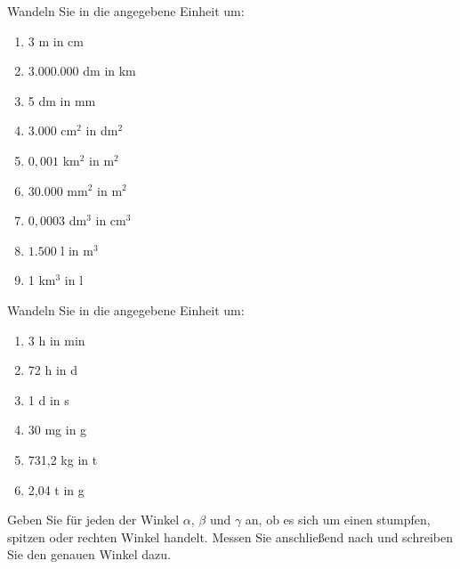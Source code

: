 \documentclass[11pt, a4paper, oneside]{article}
\begin{document}
	
	Wandeln Sie in die angegebene Einheit um:
	
	\begin{multicols}{3}
		\begin{enumerate}[label=\alph*)]
			\item 3 m in cm
			\item $3.000.000$ dm in km
			\item 5 dm in mm
			\item $3.000$ cm$^2$ in dm$^2$
			\item $0,001$ km$^2$ in m$^2$
			\item $30.000$ mm$^2$ in m$^2$
			\item $0,0003$ dm$^3$ in cm$^3$
			\item $1.500$ l in m$^3$
			\item 1 km$^3$ in l
		\end{enumerate}
	\end{multicols}
	
	\checkered[7.5cm]
	
	
	Wandeln Sie in die angegebene Einheit um:
	
	\begin{multicols}{2}
		\begin{enumerate}[label=\alph*)]
			\item 3 h in min
			\item 72 h in d
			\item 1 d in s
			\item 30 mg in g
			\item 731,2 kg in t
			\item 2,04 t in g
		\end{enumerate}
	\end{multicols}
	
	\checkered[4.5cm]
	
	
	Geben Sie für jeden der Winkel $\alpha$, $\beta$ und $\gamma$ an, ob es sich um einen stumpfen, spitzen oder rechten Winkel handelt.
	Messen Sie anschließend nach und schreiben Sie den genauen Winkel dazu.
	
	\begin{figure}[H]
		\centering
	\end{figure}
	
\end{document}
